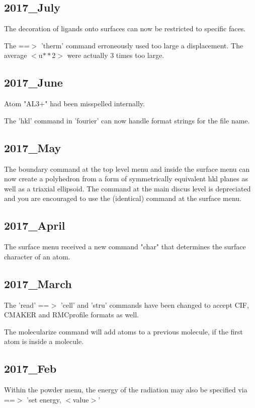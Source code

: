 \subsection*{2017\_July}
\par
The decoration of ligands onto surfaces can now be restricted to 
specific faces. 
\par
The ==$> $ 'therm' command erroneously used too large a displacement. 
The average $ <$u$**$2$> $ were actually 3 times too large. 
\subsection*{2017\_June}
\par
Atom "AL3+" had been misspelled internally. 
\par
The 'hkl' command in 'fourier' can now handle format strings for 
the file name. 
\subsection*{2017\_May}
\par
The boundary command at the top level menu and inside the surface 
menu can now create a polyhedron from a form of symmetrically 
equivalent hkl planes as well as a triaxial ellipsoid. 
The command at the main discus level is depreciated and you are 
encouraged to use the (identical) command at the surface menu. 
\subsection*{2017\_April}
\par
The surface menu received a new command "char" that determines 
the surface character of an atom. 
\subsection*{2017\_March}
\par
The 'read' ==$> $ 'cell' and 'stru' commands have been changed to 
accept CIF, CMAKER and RMCprofile formats as well. 
\par
The molecularize command will add atoms to a previous molecule, if 
the first atom is inside a molecule. 
\subsection*{2017\_Feb}
\par
Within the powder menu, the energy of the radiation may also 
be specified via ==$> $ 'set energy, $ <$value$> $' 
